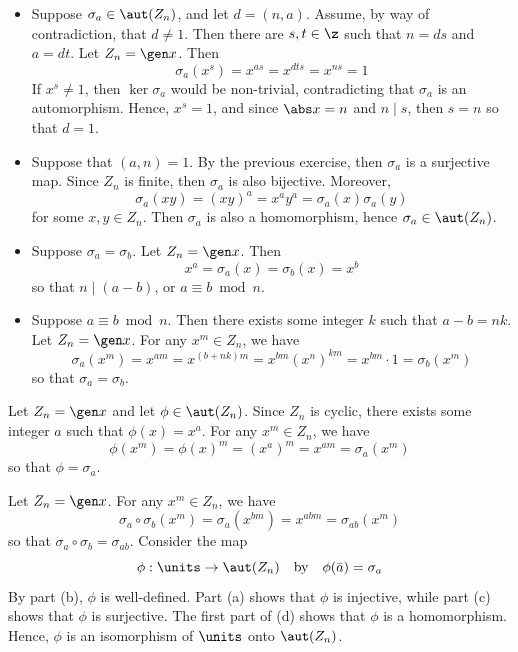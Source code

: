 \begin{solalph}
    \item 
    \begin{itemize}
        \item [\rightimp] Suppose $\sigma_a \in \aut(Z_n)$, and let $d = (n, a)$. Assume, by way of contradiction, that $d \neq 1$. Then there are $s, t \in \z$ such that $n = ds$ and $a = dt$. Let $Z_n = \gen x$. Then
        \[\sigma_a(x^s) = x^{as} = x^{dts} = x^{ns} = 1\]
        If $x^s \neq 1$, then $\ker\sigma_a$ would be non-trivial, contradicting that $\sigma_a$ is an automorphism. Hence, $x^s = 1$, and since $\abs x = n$ and $n \mid s$, then $s = n$ so that $d = 1$.
        \item [\leftimp] Suppose that $(a, n) = 1$. By the previous exercise, then $\sigma_a$ is a surjective map. Since $Z_n$ is finite, then $\sigma_a$ is also bijective. Moreover,
        \[\sigma_a(xy) = (xy)^a = x^ay^a = \sigma_a(x)\sigma_a(y)\]
        for some $x, y \in Z_n$. Then $\sigma_a$ is also a homomorphism, hence $\sigma_a \in \aut(Z_n)$.
    \end{itemize}
    \item
    \begin{itemize}
        \item [\rightimp] Suppose $\sigma_a = \sigma_b$. Let $Z_n = \gen x$. Then
        \[x^a = \sigma_a(x) = \sigma_b(x) = x^b\]
        so that $n \mid (a - b)$, or $a \equiv b \bmod n$.
        \item [\leftimp] Suppose $a \equiv b \bmod n$. Then there exists some integer $k$ such that $a - b = nk$. Let $Z_n = \gen x$. For any $x^m \in Z_n$, we have
        \[\sigma_a(x^m) = x^{am} = x^{(b + nk)m} = x^{bm} (x^n)^{km} = x^{bm} \cdot 1 = \sigma_b(x^m)\]
        so that $\sigma_a = \sigma_b$.
    \end{itemize}
    \item Let $Z_n = \gen x$ and let $\phi \in \aut(Z_n)$. Since $Z_n$ is cyclic, there exists some integer $a$ such that $\phi(x) = x^a$. For any $x^m \in Z_n$, we have
    \[\phi(x^m) = \phi(x)^m = (x^a)^m = x^{am} = \sigma_a(x^m)\]
    so that $\phi = \sigma_a$.
    \item Let $Z_n = \gen x$. For any $x^m \in Z_n$, we have
    \[\sigma_a \circ \sigma_b (x^m) = \sigma_a(x^{bm}) = x^{abm} = \sigma_{ab}(x^m)\]
    so that $\sigma_a \circ \sigma_b = \sigma_{ab}$. Consider the map
    \[\phi : \units \to \aut(Z_n) \quad \text{by} \quad \phi(\bar a) = \sigma_a\]
    By part (b), $\phi$ is well-defined. Part (a) shows that $\phi$ is injective, while part (c) shows that $\phi$ is surjective. The first part of (d) shows that $\phi$ is a homomorphism. Hence, $\phi$ is an isomorphism of $\units$ onto $\aut(Z_n)$.
\end{solalph}

